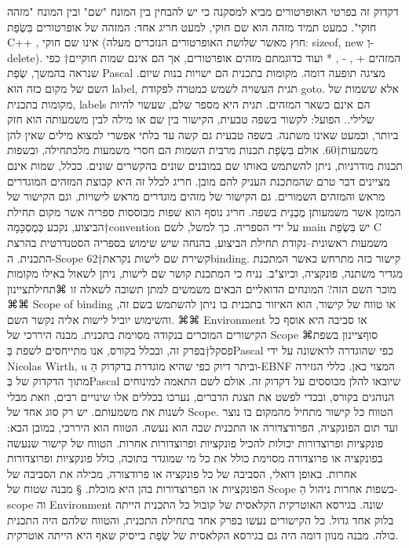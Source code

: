       דקדוק זה בפרטי האופרטורים מביא למסקנה כי יש להבחין בין המונח "שם" ובין המונח "מזהה חוקי". כמעט תמיד מזהה הוא שם חוקי, למעט חריג אחד: המזהה של אופרטורים בִּשְׂפַת C++ , אינו שם חוקי (חוץ מאשר שלושת האופרטורים הנזכרים מעלה: sizeof, new וְ- delete). המזהים + , - , * ועוד כדוגמתם מזהים אופרטורים, אך הם אינם שמות חוקיים†{ כפי שנראה בהמשך, שְׂפַת Pascal מציגה תופעה דומה. מקומות בתכנית הם ישויות בנות שיום. השם של מקום כזה הוא label, תגית העשויה לשמש כמטרה לפקודת goto. אלא ששמות של מקומות בתכנית, labels הם אינם כשאר המזהים. תגית היא מספר שלם, שעשוי להיות שלילי.}.
      הפועל: לקשור
      בשפה טבעית, הקישור בין שם או מילה לבין משמעותה הוא חזק ביותר, וכמעט שאינו משתנה. בשפה טבעית גם קשה עד בלתי אפשרי למצוא מילים שאין להן משמעות†{60}. אולם בִּשְׂפַת תכנות מרבית השמות הם חסרי משמעות מלכתחילה, ובשפות תכנות מודרניות, ניתן להשתמש באותו שם במובנים שונים בהקשרים שונים.
      ככלל, שמות אינם מציינים דבר טרם שהמתכנת העניק להם מובן. חריג לכלל זה היא קבוצת המזהים המוגדרים מראש והמזהים השמורים. גם הקישור של מזהים מוגדרים מראש לישויות, וגם הקישור של המזמן אשר משמעותן מֻבְנֵית בשפה. חריג נוסף הוא שפות מבוססות ספריה אשר מקום תחילת הביצוע, נקבע כְּמֻסְכָּמָה†{convention} על ידי הספריה. כך למשל, לשם main יש בִּשְׂפַת C משמעות ראשונית--נקודת תחילת הביצוע, בהנחה שיש שימוש בספריה הסטנדרטית בהרצת התכנית.
      ה-Scope
      קשירת שם לישות נקראת†{62}binding. קישור כזה מתרחש כאשר המתכנת מגדיר משתנה, פונקציה, וכיוצ"ב. נניח כי המתכנת קושר שם לישות, ניתן לשאול באילו מקומות מוכר השם הזה? המונחים הדואליים הבאים משמשים למתן תשובה לשאלה זו
⌘תחילת{ציינון}
      ⌘⌘ Scope of binding או טווח של קישור, הוא האיזור בתכנית בו ניתן להשתמש בשם זה, והשימוש יוביל לישות אליה נקשר השם.
      ⌘⌘ Environment או סביבה היא אוסף כל הקישורים המוכרים בנקודה מסוימת בתכנית.
      מבנה היררכי של Scope
  ⌘סוף{ציינון}
      בשפת פסקל†{בפרק זה, ובכלל בקורס, אנו מתייחסים לשפת בְּPascal כפי שהוגדרה לראשונה על ידי Nicolas Wirth, u וביתר דיוק כפי שהיא מוגדרת בדקדוק הַ-EBNF המצוי כאן. כללי הגזירה מתוך הדקדוק של בְּPascal שיובאו להלן מבוססים על דקדוק זה. אולם לשם התאמה למינוחים הנוהגים בקורס, ובכדי לפשט את הצגת הדברים, נערכו בכללים אלו שינויים רבים, וזאת מבלי לשנות את משמעותם.} יש רק סוג אחד של Scope. הטווח כל קישור מתחיל מהמקום בו נוצר ועד תום הפונקציה, הפרודצדורה או התכנית שבה הוא נעשה. הטווח הוא היררכי, במובן הבא: פונקציות ופרוצדורות יכולות להכיל פונקציות ופרוצדורות אחרות. הטווח של קישור שנעשה בפונקציה או פרוצדורה מסוימת כולל את כל מי שמוגדר בתוכה, כולל פונקציות ופרוצדורות אחרות. באופן דואלי, הסביבה של כל פונקציה או פרודצורה, מכילה את הסביבה של הפונקציות או הפרוצדורות בהן היא מוכלת.
      § מבנה שטוח של Scope
      בשפות אחרות ניהול הַ-scope וה Environment שונה. בגירסא האוטרקית הקלאסית של קובול כל התכנית הייתה בלוק אחד גדול. כל הקישורים נעשו בפרק אחד בתחילת התכנית, והטווח שלהם היה התכנית כולה. מבנה מנוון דומה היה גם בגירסא הקלאסית של שְׂפַת בייסיק שאף היא הייתה אוטרקית.

